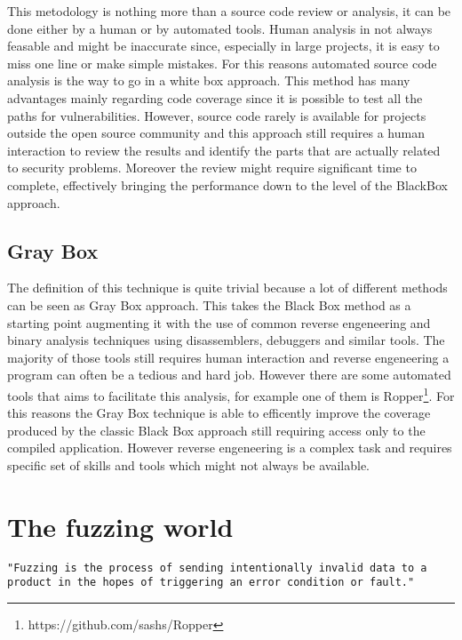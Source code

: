 \documentclass[../main.tex]{subfiles}
\begin{document}
This metodology is nothing more than a source code review or analysis, it can be
done either by a human or by automated tools. Human analysis in not always
feasable and might be inaccurate since, especially in large projects, it is easy
to miss one line or make simple mistakes. For this reasons automated source code
analysis is the way to go in a white box approach. This method has many
advantages mainly regarding code coverage since it is possible to test all the
paths for vulnerabilities. However, source code rarely is available for projects
outside the open source community and this approach still requires a human
interaction to review the results and identify the parts that are actually
related to security problems. Moreover the review might require significant time
to complete, effectively bringing the performance down to the level of the
BlackBox approach.

\subsection{Gray Box}

The definition of this technique is quite trivial because a lot of different
methods can be seen as Gray Box approach. This takes the Black Box method as a
starting point augmenting it with the use of common reverse engeneering and
binary analysis techniques using disassemblers, debuggers and similar tools. The
majority of those tools still requires human interaction and reverse engeneering
a program can often be a tedious and hard job. However there are some automated
tools that aims to facilitate this analysis, for example one of them is
Ropper\footnote{https://github.com/sashs/Ropper}. For this reasons the Gray Box
technique is able to efficently improve the coverage produced by the classic
Black Box approach still requiring access only to the compiled application.
However reverse engeneering is a complex task and requires specific set of
skills and tools which might not always be available.

\section{The fuzzing world}


\texttt{"Fuzzing is the process of sending intentionally invalid data to a
product in the hopes of triggering an error condition or fault."}
\cite{Sutton2007}
\end{document}
